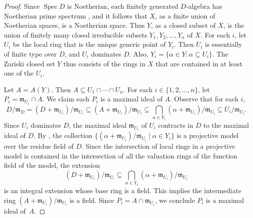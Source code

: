\documentclass[preprint, 11pt,nonatbib]{elsarticle}
\DeclareMathOperator{\Spec}{Spec}
\theoremstyle{definition}
\numberwithin{theorem}{section}
\begin{document}
\begin{proof} 
Since $\Spec D$ is Noetherian, each finitely generated $D$-algebra has  Noetherian prime spectrum \cite[Section~2]{MR229627}, and it follows that $X$, as a finite union of Noetherian spaces, is a Noetherian space. Thus $Y$, as a closed subset of $X$, is the union of finitely many closed irreducible subsets ${Y}_1,{Y}_2,\ldots,{Y}_n$ of $X$. %
For each $i$, let $U_i$ be the local ring that is the unique generic point of ${Y}_i$.  Then $U_i$ is 
essentially of finite type over $D$, and  $U_i$  dominates $D$. Also, ${Y}_i = \{\alpha \in {Y}:\alpha \subseteq U_i\}$. 
%
The Zariski closed set ${Y}$ thus consists of the rings in $X$ that are contained in at least one of the $U_i$. 


 
 Let $A = A({Y})$.
Then $A \subseteq U_1 \cap \cdots \cap U_n$. For each $i \in \{1,2,\ldots,n\}$,  let $P_i = {\mathfrak{m}}_{U_i} \cap A$. We claim each $P_i$ is a maximal ideal of $A$. 
Observe that for each $i$, $$
D / \mathfrak{m}_D =
(D+{\mathfrak{m}}_{U_i})/{\mathfrak{m}}_{U_i}
\subseteq 
(A+{\mathfrak{m}}_{U_i})/{\mathfrak{m}}_{U_i}
\subseteq \bigcap_{\alpha \in {Y}_i}(\alpha+ {\mathfrak{m}}_{U_i})/{\mathfrak{m}}_{U_i} \subseteq U_i/{\mathfrak{m}}_{U_i}.$$
Since $U_i$ dominates $D$, the maximal ideal ${\mathfrak{m}}_{U_i}$ of $U_i$ contracts in $D$ to the maximal ideal of $D$. 
By \cite[(6.2.19),p.~161]{MR1617523}, the collection $\{(\alpha+{\mathfrak{m}}_{U_i})/{\mathfrak{m}}_{U_i} \mid \alpha \in {Y}_i\}$ is a projective model over the residue field of $D$. Since the intersection of local rings in a projective model is contained in the intersection of all the valuation rings of the function field of the model, the extension     $$(D+{\mathfrak{m}}_{U_i})/{\mathfrak{m}}_{U_i} \subseteq
\bigcap_{\alpha \in {Y}_i}(\alpha+ {\mathfrak{m}}_{U_i})/{\mathfrak{m}}_{U_i}$$ 
is an integral extension whose base ring is a field.
This implies the intermediate ring $(A+{\mathfrak{m}}_{U_i})/{\mathfrak{m}}_{U_i}$ 
  is a field. Since $P_i = A \cap {\mathfrak{m}}_{U_i}$, we conclude $P_i$ is a maximal ideal of~$A$.  
 


\end{proof}
\end{document}
